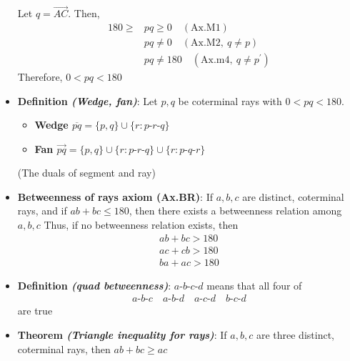 \documentclass{report}
\begin{document}
\begin{itemize}
                    \bigbreak \noindent 
                    Let $q = \overrightarrow{AC}$. Then, 
                    \begin{align*}
                        180 \geq &pq \geq 0 \quad (\text{Ax.M1})\\
                                 &pq \ne 0 \quad (\text{Ax.M2},\ q\ne p) \\
                                 &pq \ne 180 \quad (\text{Ax.m4},\ q \ne p^{\prime}) 
                    \end{align*}
                    Therefore, $0 < pq < 180$
                \item \textbf{Definition \textit{(Wedge, fan)}}: Let $p,q$ be coterminal rays with $0<pq<180$.
                    \begin{itemize}
                        \item \textbf{Wedge $\overline{pq} = \{p,q\} \cup \{r: p\text{-}r\text{-}q\}$}
                        \item \textbf{Fan $\overrightarrow{pq} = \{p,q\} \cup \{r: p\text{-}r\text{-}q\} \cup \{r: p\text{-}q\text{-}r\}$}
                    \end{itemize}
                    (The duals of segment and ray)
                \item \textbf{Betweenness of rays axiom (Ax.BR)}: If $a,b,c$ are distinct, coterminal rays, and if $ab+bc \leq 180$, then there exists a betweenness relation among $a,b,c$
                    \bigbreak \noindent 
                    Thus, if no betweenness relation exists, then
                    \begin{align*}
                        ab + bc > 180 \\
                        ac + cb > 180 \\
                        ba + ac > 180
                    \end{align*}
                \item \textbf{Definition \textit{(quad betweenness)}}: $ a\text{-}b\text{-}c\text{-}d $ means that all four of 
                    \begin{align*}
                        a\text{-}b\text{-}c \quad a\text{-}b\text{-}d \quad a\text{-}c\text{-}d \quad b\text{-}c\text{-}d
                    \end{align*}
                    are true
                \item \textbf{Theorem \textit{(Triangle inequality for rays)}}: If $a,b,c$ are three distinct, coterminal rays, then $ab + bc \geq ac$

\end{itemize}
\end{document}
